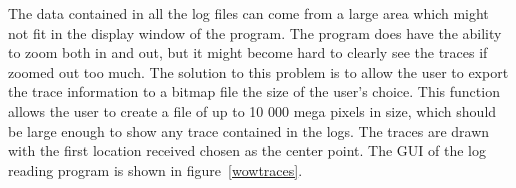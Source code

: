 

%
%

The data contained in all the log files can come from a large area which might not fit in the display window of the program. The program does have the ability to zoom both in and out, but it might become hard to clearly see the traces if zoomed out too much. The solution to this problem is to allow the user to export the trace information to a bitmap file the size of the user's choice. This function allows the user to create a file of up to 10 000 mega pixels in size, which should be large enough to show any trace contained in the logs. The traces are drawn with the first location received chosen as the center point. The GUI of the log reading program is shown in figure~\ref{wowtraces}.%

